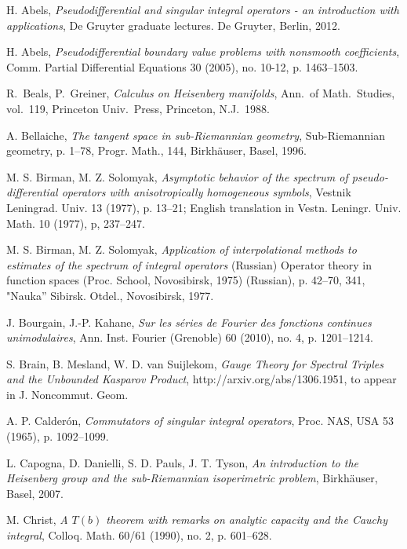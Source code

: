 \documentclass[10pt]{amsart}
\theoremstyle{remark}
\theoremstyle{definition}
\begin{document}
\begin{thebibliography}{100}

 H. Abels, \emph{Pseudodifferential and singular integral operators - an introduction with applications}, De Gruyter graduate lectures. De Gruyter, Berlin, 2012.

 H. Abels, \emph{Pseudodifferential boundary value problems with nonsmooth coefficients}, Comm. Partial Differential Equations 30 (2005), no. 10-12, p. 1463--1503.

R.~Beals, P.~Greiner, \emph{Calculus on Heisenberg manifolds}, Ann.~of Math.~Studies, vol.~119, Princeton Univ.~Press, Princeton, N.J.~1988.

 A. Bellaiche, \emph{The tangent space in sub-Riemannian geometry}, Sub-Riemannian geometry, p. 1--78, Progr. Math., 144, Birkh\"auser, Basel, 1996.

 M. S. Birman, M. Z. Solomyak, \emph{Asymptotic behavior of the spectrum
of pseudo-differential operators with anisotropically homogeneous symbols}, Vestnik Leningrad. Univ. 13 (1977), p. 13--21; English translation in Vestn. Leningr. Univ. Math. 10 (1977), p, 237--247.

 M. S. Birman, M. Z. Solomyak, \emph{Application of interpolational methods to estimates of the spectrum of integral operators} (Russian) Operator theory in function spaces (Proc. School, Novosibirsk, 1975) (Russian), p. 42--70, 341, "Nauka'' Sibirsk. Otdel., Novosibirsk, 1977.

 J. Bourgain, J.-P. Kahane, \emph{Sur les s\'eries de Fourier des fonctions continues unimodulaires}, Ann. Inst. Fourier (Grenoble) 60 (2010), no. 4, p. 1201--1214. 

 S. Brain, B. Mesland, W. D. van Suijlekom, \emph{Gauge Theory for Spectral Triples and the Unbounded Kasparov Product}, http://arxiv.org/abs/1306.1951, to appear in J. Noncommut. Geom.

 A. P. Calder\'{o}n, \emph{Commutators of singular integral operators}, Proc. NAS, USA 53 (1965), p. 1092--1099.

 L. Capogna, D. Danielli, S. D. Pauls, J. T. Tyson, \emph{An introduction to the Heisenberg group and the sub-Riemannian isoperimetric problem}, Birkh\"auser, Basel, 2007.

 M. Christ, \emph{A $T(b)$ theorem with remarks on analytic capacity and the Cauchy integral}, Colloq. Math. 60/61 (1990), no. 2, p. 601--628.


\end{thebibliography}
\end{document}
